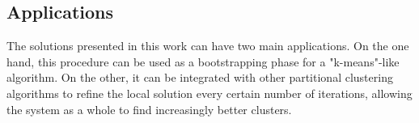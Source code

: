 \subsection*{Applications}
The solutions presented in this work can have two main applications. On the one hand,
this procedure can be used as a bootstrapping phase for a  "k-means"-like algorithm. 
On the other, it can be integrated with other partitional clustering algorithms to
refine the local solution every certain number of iterations, allowing the system as a
whole to find increasingly better clusters.